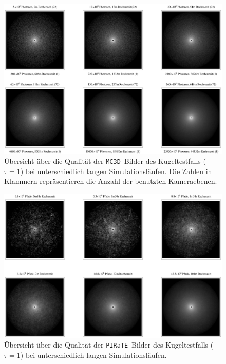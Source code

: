 \documentclass[
	12pt,
	a4paper,
	pagesize=auto,
	DIV=10,
	parskip=half,
	titlepage,
	twoside,
	listof=totoc,
	bibliography=totocnumbered,
	final%
]{scrbook}
\begin{document}
		\begin{figure}
			\centering
			\vspace{-1em}
			\includegraphics[angle=90,height=1.0\textheight]{mc3dsphereimageoverview2.eps}
			\caption{Übersicht über die Qualität der \texttt{MC3D}--Bilder des Kugeltestfalls ($\tau=1$) bei unterschiedlich langen Simulationsläufen. Die Zahlen in Klammern repräsentieren die Anzahl der benutzten Kameraebenen.}
			\label{fig:mc3dsphere_image_overview2}
		\end{figure}
		\begin{figure}
			\centering
			\vspace{-1em}
			\includegraphics[angle=90,height=1.0\textheight]{piratesphereimageoverview2.eps}
			\caption{Übersicht über die Qualität der \texttt{PIRaTE}--Bilder des Kugeltestfalls ($\tau=1$) bei unterschiedlich langen Simulationsläufen.}
			\label{fig:piratesphere_image_overview2}
		\end{figure}
\end{document}
